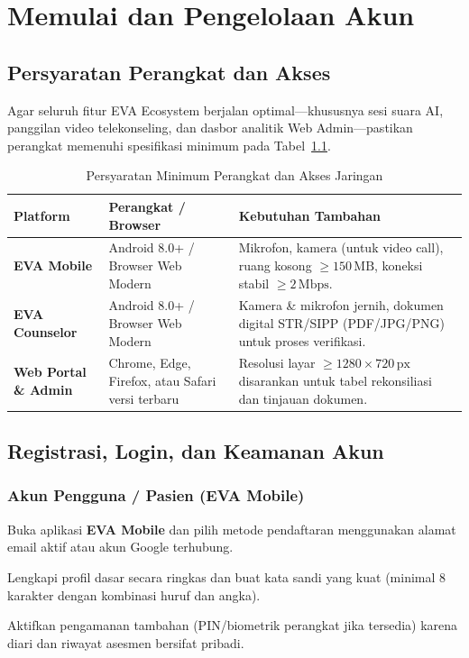 \chapter{Memulai dan Pengelolaan Akun}
\label{chap:memulai-akun}

\section{Persyaratan Perangkat dan Akses}
Agar seluruh fitur EVA Ecosystem berjalan optimal—khususnya sesi suara AI, panggilan video telekonseling, dan dasbor analitik Web Admin—pastikan perangkat memenuhi spesifikasi minimum pada Tabel~\ref{tab:persyaratan-perangkat}.

\begin{table}[htbp]
  \centering
  \caption{Persyaratan Minimum Perangkat dan Akses Jaringan}
  \label{tab:persyaratan-perangkat}
  \small
  \begin{tabularx}{\textwidth}{@{}p{3.4cm}p{4.5cm}X@{}}
    \toprule
    \textbf{Platform} & \textbf{Perangkat / Browser} & \textbf{Kebutuhan Tambahan} \\
    \midrule
    \textbf{EVA Mobile} & Android 8.0+ / Browser Web Modern & Mikrofon, kamera (untuk video call), ruang kosong $\ge 150\,\text{MB}$, koneksi stabil $\ge 2\,\text{Mbps}$. \\
    \addlinespace[4pt]
    \textbf{EVA Counselor} & Android 8.0+ / Browser Web Modern & Kamera \& mikrofon jernih, dokumen digital STR/SIPP (PDF/JPG/PNG) untuk proses verifikasi. \\
    \addlinespace[4pt]
    \textbf{Web Portal \& Admin} & Chrome, Edge, Firefox, atau Safari versi terbaru & Resolusi layar $\ge 1280 \times 720\,\text{px}$ disarankan untuk tabel rekonsiliasi dan tinjauan dokumen. \\
    \bottomrule
  \end{tabularx}
\end{table}

\section{Registrasi, Login, dan Keamanan Akun}

\subsection{Akun Pengguna / Pasien (EVA Mobile)}
\begin{steplist}
  \item Buka aplikasi \textbf{EVA Mobile} dan pilih metode pendaftaran menggunakan alamat email aktif atau akun Google terhubung.
  \item Lengkapi profil dasar secara ringkas dan buat kata sandi yang kuat (minimal 8 karakter dengan kombinasi huruf dan angka).
  \item Aktifkan pengamanan tambahan (PIN/biometrik perangkat jika tersedia) karena diari dan riwayat asesmen bersifat pribadi.
\end{steplist}

